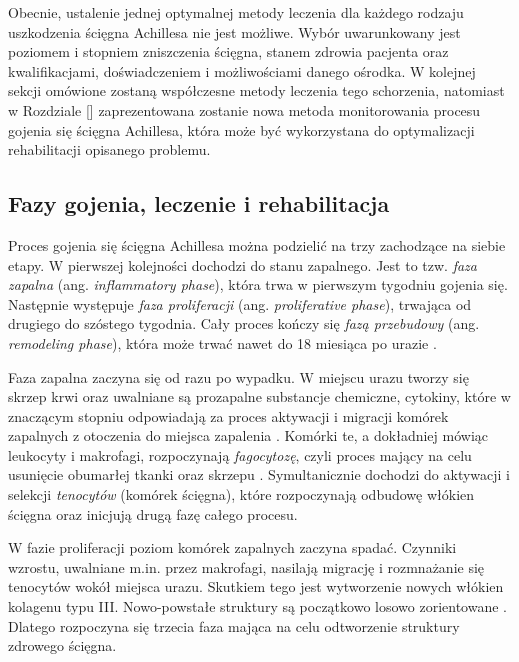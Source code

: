 Obecnie, ustalenie jednej optymalnej metody leczenia dla każdego rodzaju uszkodzenia ścięgna Achillesa nie jest możliwe. Wybór uwarunkowany jest poziomem i stopniem zniszczenia ścięgna, stanem zdrowia pacjenta oraz kwalifikacjami, doświadczeniem i możliwościami danego ośrodka. W kolejnej sekcji omówione zostaną współczesne metody leczenia tego schorzenia, natomiast w Rozdziale [] zaprezentowana zostanie nowa metoda monitorowania procesu gojenia się ścięgna Achillesa, która może być wykorzystana do optymalizacji rehabilitacji opisanego problemu. 

\subsection{Fazy gojenia, leczenie i rehabilitacja}
\label{gojenie}

Proces gojenia się ścięgna Achillesa można podzielić na trzy zachodzące na siebie etapy. W pierwszej kolejności dochodzi do stanu zapalnego. Jest to tzw. \textit{faza zapalna} (ang. \textit{inflammatory phase}), która trwa w pierwszym tygodniu gojenia się. Następnie występuje \textit{faza proliferacji} (ang. \textit{proliferative phase}), trwająca od drugiego do szóstego tygodnia. Cały proces kończy się \textit{fazą przebudowy} (ang. \textit{remodeling phase}), która może trwać nawet do 18 miesiąca po urazie \cite{Sharma2006, Yang2013, Docheva2015, CMC}. 

Faza zapalna zaczyna się od razu po wypadku. W miejscu urazu tworzy się skrzep krwi oraz uwalniane są prozapalne substancje chemiczne, cytokiny, które w znaczącym stopniu odpowiadają za proces aktywacji i migracji komórek zapalnych z otoczenia do miejsca zapalenia \cite{Lin2004}. Komórki te, a dokładniej mówiąc leukocyty i makrofagi, rozpoczynają \textit{fagocytozę}, czyli proces mający na celu usunięcie obumarłej tkanki oraz skrzepu \cite{Yang2013, Beredjiklian2003, Lin2004}. Symultanicznie dochodzi do aktywacji i selekcji \textit{tenocytów} (komórek ścięgna), które rozpoczynają odbudowę włókien ścięgna \cite{Yang2013} oraz inicjują drugą fazę całego procesu.

W fazie proliferacji poziom komórek zapalnych zaczyna spadać. Czynniki wzrostu, uwalniane m.in. przez makrofagi, nasilają migrację i rozmnażanie się tenocytów wokół miejsca urazu. Skutkiem tego jest wytworzenie nowych włókien kolagenu typu III. Nowo-powstałe struktury są początkowo losowo zorientowane \cite{Yang2013, Beredjiklian2003, Docheva2015}. Dlatego rozpoczyna się trzecia faza mająca na celu odtworzenie struktury zdrowego ścięgna.

